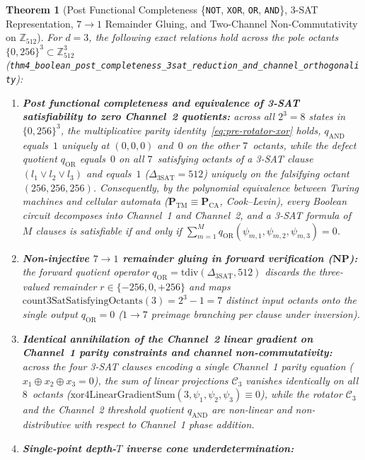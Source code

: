 \documentclass[11pt,a4paper]{article}
\theoremstyle{plain}
\newtheorem{theorem}{Theorem}[section]
\theoremstyle{definition}
\begin{document}
\begin{theorem}[Post Functional Completeness \{\texttt{NOT}, \texttt{XOR}, \texttt{OR}, \texttt{AND}\}, 3-SAT Representation, $7\to 1$ Remainder Gluing, and Two-Channel Non-Commutativity on $\mathbb{Z}_{512}$]
\label{thm:main-4}
For $d=3$, the following exact relations hold across the pole octants $\{0,256\}^3\subset\mathbb{Z}_{512}^3$ (\texttt{thm4\_boolean\_post\_completeness\_3sat\_reduction\_and\_channel\_orthogonality}):
\begin{enumerate}[label=\textbf{(\roman*)},leftmargin=*]
\item \textbf{Post functional completeness and equivalence of 3-SAT satisfiability to zero Channel~2 quotients:}
  across all $2^3=8$ states in $\{0,256\}^3$, the multiplicative parity identity~\eqref{eq:pre-rotator-xor} holds, $q_{\mathrm{AND}}$ equals~$1$ uniquely at $(0,0,0)$ and~$0$ on the other $7$~octants, while the defect quotient $q_{\mathrm{OR}}$ equals~$0$ on all $7$~satisfying octants of a 3-SAT clause $(l_1\lor l_2\lor l_3)$ and equals~$1$ ($\Delta_{\mathrm{3SAT}}=512$) uniquely on the falsifying octant $(256,256,256)$. Consequently, by the polynomial equivalence between Turing machines and cellular automata ($\mathbf{P}_{\mathrm{TM}}\equiv\mathbf{P}_{\mathrm{CA}}$, Cook--Levin), every Boolean circuit decomposes into Channel~1 and Channel~2, and a 3-SAT formula of $M$ clauses is satisfiable if and only if $\sum_{m=1}^M q_{\mathrm{OR}}(\psi_{m,1},\psi_{m,2},\psi_{m,3}) = 0$.
\item \textbf{Non-injective $7\to 1$ remainder gluing in forward verification ($\mathbf{NP}$):}
  the forward quotient operator $q_{\mathrm{OR}}=\mathrm{tdiv}(\Delta_{\mathrm{3SAT}},512)$ discards the three-valued remainder $r\in\{-256,0,+256\}$ and maps $\mathrm{count3SatSatisfyingOctants}(3)=2^3-1=7$ distinct input octants onto the single output $q_{\mathrm{OR}}=0$ ($1\to 7$ preimage branching per clause under inversion).
\item \textbf{Identical annihilation of the Channel~2 linear gradient on Channel~1 parity constraints and channel non-commutativity:}
  across the four 3-SAT clauses encoding a single Channel~1 parity equation ($x_1\oplus x_2\oplus x_3=0$), the sum of linear projections $\mathcal{C}_3$ vanishes identically on all $8$~octants ($\mathrm{xor4LinearGradientSum}(3,\psi_1,\psi_2,\psi_3)\equiv 0$), while the rotator $\mathcal{C}_3$ and the Channel~2 threshold quotient $q_{\mathrm{AND}}$ are non-linear and non-distributive with respect to Channel~1 phase addition.
\item \textbf{Single-point depth-$T$ inverse cone underdetermination:}

\end{enumerate}
\end{theorem}
\end{document}
